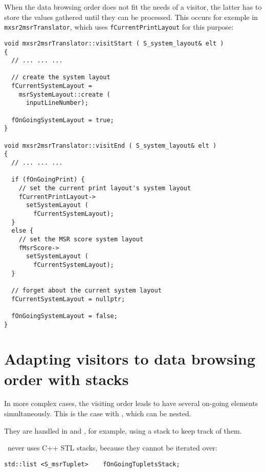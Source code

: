 When the data browsing order does not fit the needs of a visitor, the latter has to store the values gathered until they can be processed. This occurs for exemple in {\tt mxsr2msrTranslator}, which uses {\tt fCurrentPrintLayout} for this purpose:
\begin{lstlisting}[language=CPlusPlus]
void mxsr2msrTranslator::visitStart ( S_system_layout& elt )
{
  // ... ... ...

  // create the system layout
  fCurrentSystemLayout =
    msrSystemLayout::create (
      inputLineNumber);

  fOnGoingSystemLayout = true;
}

void mxsr2msrTranslator::visitEnd ( S_system_layout& elt )
{
  // ... ... ...

  if (fOnGoingPrint) {
    // set the current print layout's system layout
    fCurrentPrintLayout->
      setSystemLayout (
        fCurrentSystemLayout);
  }
  else {
    // set the MSR score system layout
    fMsrScore->
      setSystemLayout (
        fCurrentSystemLayout);
  }

  // forget about the current system layout
  fCurrentSystemLayout = nullptr;

  fOnGoingSystemLayout = false;
}
\end{lstlisting}


\section{Adapting visitors to data browsing order with stacks}

In more complex cases, the visiting order leads to have several on-going elements simultaneously. This is the case with , which can be nested.

They are handled in  and , for example, using a stack to keep track of them.

\mf\ never uses C++ STL stacks, because they cannot be iterated over:
\begin{lstlisting}[language=CPlusPlus]
    std::list <S_msrTuplet>    fOnGoingTupletsStack;
\end{lstlisting}

